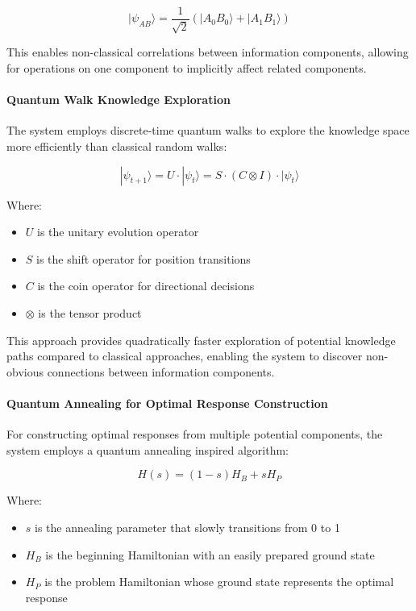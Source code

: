 \documentclass[journal,onecolumn]{IEEEtran}
\begin{document}
\begin{equation}
|\psi_{AB}\rangle = \frac{1}{\sqrt{2}}(|A_0 B_0\rangle + |A_1 B_1\rangle)
\end{equation}

This enables non-classical correlations between information components, allowing for operations on one component to implicitly affect related components.

\paragraph{Quantum Walk Knowledge Exploration}
The system employs discrete-time quantum walks to explore the knowledge space more efficiently than classical random walks:

\begin{equation}
|\psi_{t+1}\rangle = U \cdot |\psi_t\rangle = S \cdot (C \otimes I) \cdot |\psi_t\rangle
\end{equation}

Where:
\begin{itemize}
\item $U$ is the unitary evolution operator
\item $S$ is the shift operator for position transitions
\item $C$ is the coin operator for directional decisions
\item $\otimes$ is the tensor product
\end{itemize}

This approach provides quadratically faster exploration of potential knowledge paths compared to classical approaches, enabling the system to discover non-obvious connections between information components.

\paragraph{Quantum Annealing for Optimal Response Construction}
For constructing optimal responses from multiple potential components, the system employs a quantum annealing inspired algorithm:

\begin{equation}
H(s) = (1-s)H_B + sH_P
\end{equation}

Where:
\begin{itemize}
\item $s$ is the annealing parameter that slowly transitions from 0 to 1
\item $H_B$ is the beginning Hamiltonian with an easily prepared ground state
\item $H_P$ is the problem Hamiltonian whose ground state represents the optimal response
\end{itemize}
\end{document}
